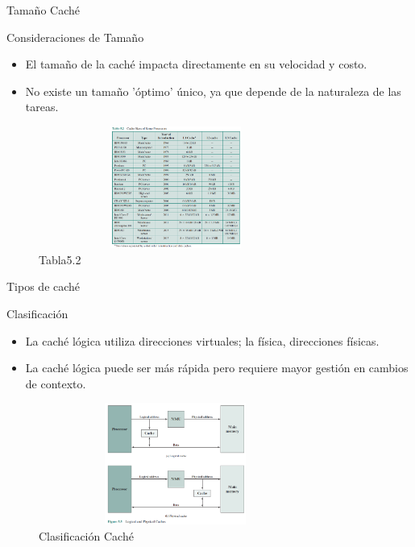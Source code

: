 \documentclass[presentation]{beamer}
\begin{document}
\begin{frame}[label={sec:org8b7805d}]{Tamaño Caché}
\begin{block}{Consideraciones de Tamaño}
\begin{itemize}
\item El tamaño de la caché impacta directamente en su velocidad y costo.
\item No existe un tamaño 'óptimo' único, ya que depende de la naturaleza de las tareas.
\end{itemize}
\begin{figure}[!h]
   \vspace{-0.1cm}
   \centering
   \includegraphics[height=4cm, width=0.8\textwidth]{./Imagenes/tabla5.2.png}
   \vspace{-0.5cm} %
   \caption{Tabla5.2}
   \label{fig:Representacion}
\end{figure}
\end{block}
\end{frame}



\begin{frame}[label={sec:orgcd13e65}]{Tipos de caché}
\begin{block}{Clasificación}
\begin{itemize}
\item La caché lógica utiliza direcciones virtuales; la física, direcciones físicas.
\item La caché lógica puede ser más rápida pero requiere mayor gestión en cambios de contexto.
\end{itemize}


\begin{figure}[!h]
   \vspace{-0.1cm}
   \centering
   \includegraphics[height=4cm, width=0.8\textwidth]{./Imagenes/fig5.png}
   \vspace{-0.5cm} %
   \caption{Clasificación Caché}
   \label{fig:Representacion}
\end{figure}
\end{block}
\end{frame}
\end{document}
